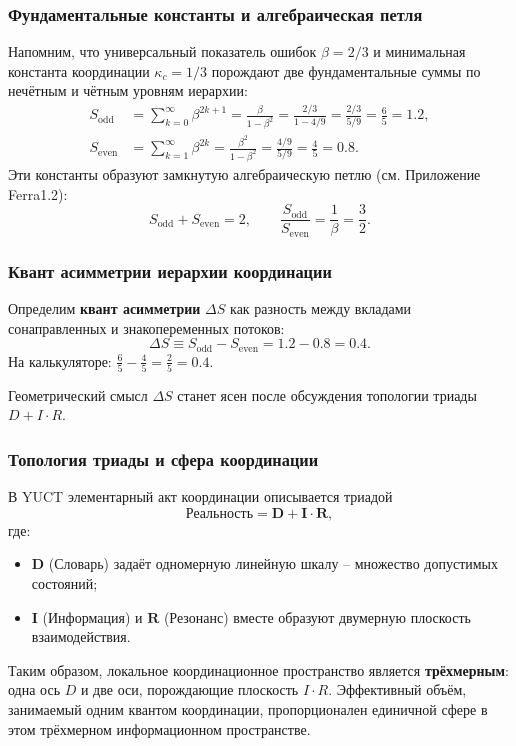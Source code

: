 \documentclass[12pt,a4paper]{article}
\begin{document}
	\subsubsection{Фундаментальные константы и алгебраическая петля}
	
	Напомним, что универсальный показатель ошибок \(\beta = 2/3\) и минимальная константа координации \(\kappa_c = 1/3\) порождают две фундаментальные суммы по нечётным и чётным уровням иерархии:
	\begin{align}
		S_{\mathrm{odd}} &= \sum_{k=0}^{\infty} \beta^{2k+1} = \frac{\beta}{1-\beta^2} = \frac{2/3}{1-4/9} = \frac{2/3}{5/9} = \frac{6}{5} = 1.2, \label{eq:Sodd_again}\\
		S_{\mathrm{even}} &= \sum_{k=1}^{\infty} \beta^{2k} = \frac{\beta^2}{1-\beta^2} = \frac{4/9}{5/9} = \frac{4}{5} = 0.8. \label{eq:Seven_again}
	\end{align}
	Эти константы образуют замкнутую алгебраическую петлю (см. Приложение Ferra1.2):
	\[
	S_{\mathrm{odd}} + S_{\mathrm{even}} = 2, \qquad \frac{S_{\mathrm{odd}}}{S_{\mathrm{even}}} = \frac{1}{\beta} = \frac{3}{2}.
	\]
	
	\subsubsection{Квант асимметрии иерархии координации}
	
	Определим \textbf{квант асимметрии} \(\Delta S\) как разность между вкладами сонаправленных и знакопеременных потоков:
	\[
	\Delta S \equiv S_{\mathrm{odd}} - S_{\mathrm{even}} = 1.2 - 0.8 = 0.4.
	\]
	На калькуляторе: \(\frac{6}{5} - \frac{4}{5} = \frac{2}{5} = 0.4.\)
	
	Геометрический смысл \(\Delta S\) станет ясен после обсуждения топологии триады \(D+I\cdot R\).
	
	\subsubsection{Топология триады и сфера координации}
	
	В YUCT элементарный акт координации описывается триадой
	\[
	\text{Реальность} = \mathbf{D} + \mathbf{I}\cdot\mathbf{R},
	\]
	где:
	\begin{itemize}
		\item \(\mathbf{D}\) (Словарь) задаёт одномерную линейную шкалу -- множество допустимых состояний;
		\item \(\mathbf{I}\) (Информация) и \(\mathbf{R}\) (Резонанс) вместе образуют двумерную плоскость взаимодействия.
	\end{itemize}
	Таким образом, локальное координационное пространство является \textbf{трёхмерным}: одна ось \(D\) и две оси, порождающие плоскость \(I\cdot R\). Эффективный объём, занимаемый одним квантом координации, пропорционален единичной сфере в этом трёхмерном информационном пространстве.
	
\end{document}
